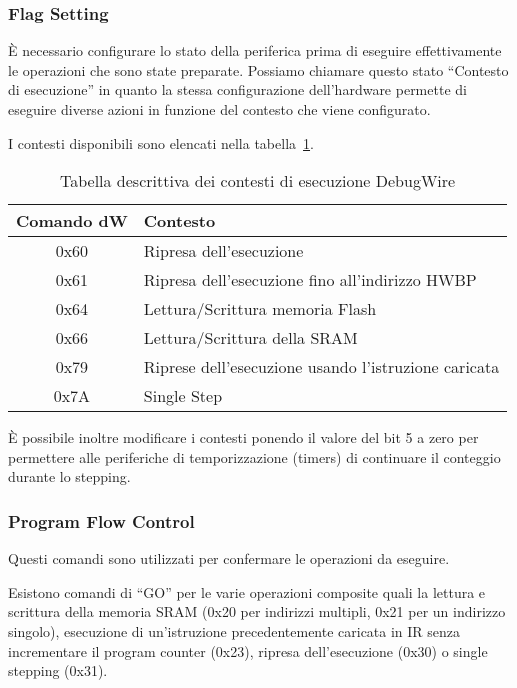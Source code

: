 \subsubsection{Flag Setting}

È necessario configurare lo stato della periferica prima di eseguire effettivamente le operazioni che sono state preparate. Possiamo chiamare questo stato ``Contesto di esecuzione'' in quanto la stessa configurazione dell'hardware permette di eseguire diverse azioni in funzione del contesto che viene configurato.

I contesti disponibili sono elencati nella tabella~\ref{tab:dw-contexts}.

\begin{table}[ht]
    \centering
    \begin{tabular}{ c l }
        \textbf{Comando dW} & \textbf{Contesto} \\
        \hline
        0x60 & Ripresa dell'esecuzione\\
        0x61 & Ripresa dell'esecuzione fino all'indirizzo HWBP\\
        0x64 & Lettura/Scrittura memoria Flash\\
        0x66 & Lettura/Scrittura della SRAM\\
        0x79 & Riprese dell'esecuzione usando l'istruzione caricata\\
        0x7A & Single Step\\
        \hline
    \end{tabular}
    \caption[]{Tabella descrittiva dei contesti di esecuzione DebugWire\cite{site:dw-reverse-engeneering}}\label{tab:dw-contexts}
\end{table}

È possibile inoltre modificare i contesti ponendo il valore del bit 5 a zero per permettere alle periferiche di temporizzazione (timers) di continuare il conteggio durante lo stepping.

\subsubsection{Program Flow Control}

Questi comandi sono utilizzati per confermare le operazioni da eseguire.

Esistono comandi di ``GO'' per le varie operazioni composite quali la lettura e scrittura della memoria SRAM (0x20 per indirizzi multipli, 0x21 per un indirizzo singolo), esecuzione di un'istruzione precedentemente caricata in IR senza incrementare il program counter (0x23), ripresa dell'esecuzione (0x30) o single stepping (0x31).

